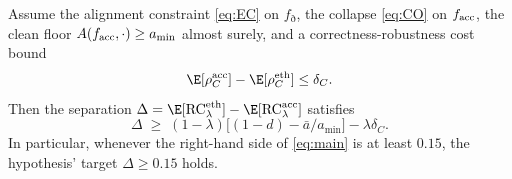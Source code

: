 \begin{theorem}\label{thm:main}
Assume the alignment constraint \eqref{eq:EC} on $f_\eth$, the collapse
\eqref{eq:CO} on $f_{\mathrm{acc}}$, the clean floor $A(f_{\mathrm{acc}},\cdot)\ge a_{\min}$ almost
surely, and a correctness-robustness cost bound
\begin{equation}\label{eq:costbound}
  \E[\rho_C^{\acc}]-\E[\rho_C^{\eth}]\le\delta_C.
\end{equation}
Then the separation $\Delta=\E[\RC_\lambda^{\eth}]-\E[\RC_\lambda^{\acc}]$ satisfies
\begin{equation}\label{eq:main}
  \Delta \;\ge\; (1-\lambda)\big[(1-d)-\bar a/a_{\min}\big]-\lambda\delta_C.
\end{equation}
In particular, whenever the right-hand side of \eqref{eq:main} is at least $0.15$,
the hypothesis' target $\Delta\ge0.15$ holds.
\end{theorem}

